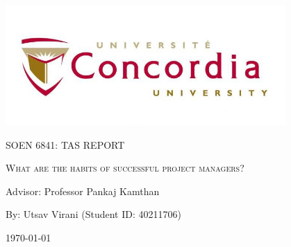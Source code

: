 \documentclass{article}
\begin{document}
\begin{titlepage}
    \centering
    \includegraphics[width=0.8\textwidth]{image.jpeg}\par %
     \vspace{2cm}
    {\scshape\Large SOEN 6841: TAS REPORT \par}
    \vspace{1.5cm}
    {\scshape\Huge What are the habits of successful project managers?\par}
    \vspace{1.5cm}
    \vspace{1.5cm}
    {\large Advisor: Professor Pankaj Kamthan\par}
    \vspace{1.5cm}
    {\large By: Utsav Virani (Student ID: 40211706)\par}
    \vspace{1cm}
    {\large \today\par}
\end{titlepage}

\tableofcontents

\newpage
\end{document}
